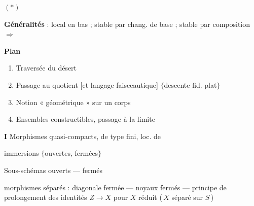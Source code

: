 \documentclass[11pt,a4paper]{article}
\begin{document}
$(*)$



\textbf{Généralités} : local en bas ; stable par chang. de base ; stable par composition $\Longrightarrow$ 

\textbf{Plan}

\begin{enumerate}
  \item[a)] Traversée du désert
  \item[b)] Passage au quotient [et langage faisceautique] $\{$descente fid. plat$\}$
  \item[c)] Notion « géométrique » sur un corps
  \item[d)] \struck{\ill{}} Ensembles constructibles, passage à la limite
\end{enumerate}



\textbf{I} Morphismes quasi-compacts, de type fini, loc. de 

immersions $\{$ouvertes, fermées$\}$ 

Sous-schémas ouverts --- fermés

morphismes séparés : diagonale fermée --- noyaux fermés --- principe de prolongement des identités $Z \to X$ pour $X$ réduit (\,$X$ séparé sur $S$\,)

\end{document}
